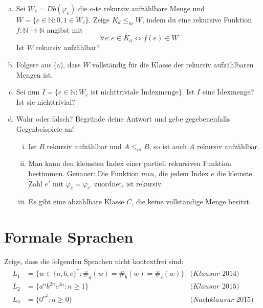\documentclass[german,headsepline]{scrartcl}
\theoremstyle{definition}
\begin{document}
	\begin{question}[subtitle={Blatt 13, 2015}]
		\begin{enumerate}[(a)]
			\item Sei $W_e=Db(\varphi_e)$ die $e$-te rekursiv aufzählbare Menge
				und $W=\{e\in\mathbb{N}\colon0,1\in W_e\}$.
				Zeige $K_d\leq_mW$, indem du eine rekursive Funktion $f:\mathbb{N}\to\mathbb{N}$ angibst mit
				\[\forall e\colon e\in K_d\Leftrightarrow f(e)\in W\]
				Ist $W$ rekursiv aufzählbar?
			\item Folgere aus (a), dass $W$ vollständig für die Klasse der rekursiv aufzählbaren Mengen ist.
			\item Sei nun $I=\{e\in\mathbb{N}\colon W_e\text{ ist nichttriviale Indexmenge}\}$.
				Ist $I$ eine Idexmenge? Ist sie nichttrivial?
			\item Wahr oder falsch?
				Begründe deine Antwort und gebe gegebenenfalls Gegenbeispiele an!
				\begin{enumerate}[(i)]
					\item Ist $B$ rekursiv aufzählbar und $A\leq_m B$, so ist auch $A$ rekursiv aufzählbar.
					\item Man kann den kleinsten Index einer partiell rekursiven Funktion bestimmen.
						Genauer: Die Funktion $min$,
						die jedem Index $e$ die kleinste Zahl $e'$ mit $\varphi_e=\varphi_{e'}$ zuordnet, ist rekursiv
					\item Es gibt eine abzählbare Klasse $C$, die keine vollständige Menge besitzt.
				\end{enumerate}
		\end{enumerate}
	\end{question}
	
	\newpage
	\section{Formale Sprachen}
	\begin{question}
		Zeige, dass die folgenden Sprachen nicht kontextfrei sind:
		\begin{align*}
			L_1 &= \{w\in\{a,b,c\}^*\colon \#_a(w)=\#_b(w)=\#_c(w)\} & \textit{(Klausur 2014)} \\
			L_2 &= \{a^nb^{2n}c^{3n}\colon n\geq1\} & \textit{(Klausur 2015)} \\
			L_3 &= \{0^{n^2}\colon n\geq0\} & \textit{(Nachklausur 2015)}
		\end{align*}
	\end{question}
	
\end{document}
